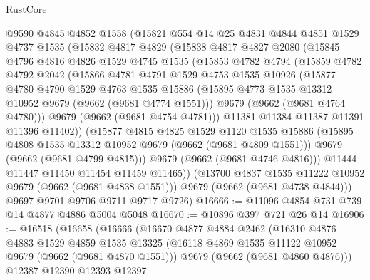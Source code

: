 \begin{lexlean}{RustCore}
\begin{coremodule}
      @9590
      @4845
      @4852
      @1558
      (@15821
        @554
        @14
        @25
        @4831
        @4844
        @4851
        @1529
        @4737
        @1535
        (@15832
          @4817
          @4829
          (@15838
            @4817
            @4827
            @2080
            (@15845
              @4796
              @4816
              @4826
              @1529
              @4745
              @1535
              (@15853
                @4782
                @4794
                (@15859
                  @4782
                  @4792
                  @2042
                  (@15866
                    @4781
                    @4791
                    @1529
                    @4753
                    @1535
                    @10926
                    (@15877
                      @4780
                      @4790
                      @1529
                      @4763
                      @1535
                      @15886
                      (@15895 @4773 @1535 @13312 @10952 @9679 (@9662 (@9681 @4774 @1551)))
                      @9679
                      (@9662 (@9681 @4764 @4780)))
                    @9679
                    (@9662 (@9681 @4754 @4781)))
                  @11381
                  @11384
                  @11387
                  @11391
                  @11396
                  @11402))
              (@15877
                @4815
                @4825
                @1529
                @1120
                @1535
                @15886
                (@15895 @4808 @1535 @13312 @10952 @9679 (@9662 (@9681 @4809 @1551)))
                @9679
                (@9662 (@9681 @4799 @4815)))
              @9679
              (@9662 (@9681 @4746 @4816)))
            @11444
            @11447
            @11450
            @11454
            @11459
            @11465))
        (@13700 @4837 @1535 @11222 @10952 @9679 (@9662 (@9681 @4838 @1551)))
        @9679
        (@9662 (@9681 @4738 @4844)))
      @9697
      @9701
      @9706
      @9711
      @9717
      @9726)
@16666 := @11096 @4854 @731 @739 @14 @4877 @4886 @5004 @5048
@16670 := @10896 @397 @721 @26 @14
@16906 := @16518
    (@16658
      (@16666
        (@16670
          @4877
          @4884
          @2462
          (@16310
            @4876
            @4883
            @1529
            @4859
            @1535
            @13325
            (@16118 @4869 @1535 @11122 @10952 @9679 (@9662 (@9681 @4870 @1551)))
            @9679
            (@9662 (@9681 @4860 @4876)))
          @12387
          @12390
          @12393
          @12397

\end{coremodule}
\end{lexlean}
